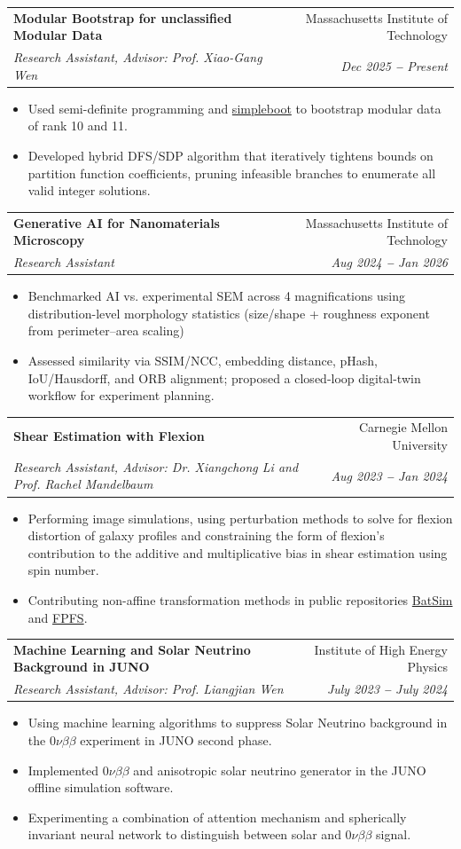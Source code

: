 \documentclass[letterpaper,11pt]{article}
\makeatletter
\newcommand{\resumeItem}[1]{
  \item\small{
    {#1 \vspace{-2pt}}
  }
}
\newcommand{\resumeSubheading}[4]{
  \vspace{-2pt}\item
    \begin{tabular*}{0.97\textwidth}[t]{l@{\extracolsep{\fill}}r}
      \textbf{#1} & #2 \\
      \textit{\small#3} & \textit{\small #4} \\
    \end{tabular*}\vspace{-7pt}
}
\newcommand{\resumeItemListStart}{\begin{itemize}}
\newcommand{\resumeItemListEnd}{\end{itemize}\vspace{-5pt}}
\makeatother
\begin{document}
        \resumeSubheading
      {Modular Bootstrap for unclassified Modular Data}{Massachusetts Institute of Technology}
      {Research Assistant, Advisor: Prof. Xiao-Gang Wen}{Dec 2025 \textbf{--} Present}
        \resumeItemListStart
            \resumeItem{Used semi-definite programming and \href{https://gitlab.com/bootstrapcollaboration/simpleboot}{simpleboot} to bootstrap modular data of rank 10 and 11. }
            \resumeItem{Developed hybrid DFS/SDP algorithm that iteratively tightens bounds on partition function coefficients, pruning infeasible branches to enumerate all valid integer solutions.}
        \resumeItemListEnd
\resumeSubheading
      {Generative AI for Nanomaterials Microscopy}{Massachusetts Institute of Technology}
      {Research Assistant}{Aug 2024 \textbf{--} Jan 2026}
        \resumeItemListStart
            \resumeItem{ Benchmarked AI vs. experimental SEM across 4 magnifications using distribution-level morphology statistics (size/shape + roughness exponent from perimeter–area scaling)}
            \resumeItem{Assessed similarity via SSIM/NCC, embedding distance, pHash, IoU/Hausdorff, and ORB alignment; proposed a closed-loop digital-twin workflow for experiment planning.}
        \resumeItemListEnd
    \resumeSubheading
      {Shear Estimation with Flexion}{Carnegie Mellon University}
      {Research Assistant, Advisor: Dr. Xiangchong Li and Prof. Rachel Mandelbaum}{Aug 2023 \textbf{--} Jan 2024}
        \resumeItemListStart
            \resumeItem{Performing image simulations, using perturbation methods to solve for flexion distortion of galaxy profiles and constraining the form of flexion’s contribution to the additive and multiplicative bias in shear estimation using spin number.}
            \resumeItem{Contributing non-affine transformation methods in public repositories \href{https://github.com/CMacM/BATSim}{BatSim} and \href{https://github.com/mr-superonion/FPFS}{FPFS}.}
        \resumeItemListEnd
    \resumeSubheading
      {Machine Learning and Solar Neutrino Background in JUNO}{Institute of High Energy Physics}
      {Research Assistant, Advisor: Prof. Liangjian Wen}{July 2023 \textbf{--} July 2024}
        \resumeItemListStart
            \resumeItem{Using machine learning algorithms to suppress Solar Neutrino background in the $0\nu \beta\beta$ experiment in JUNO second phase.}
            \resumeItem{Implemented $0\nu \beta\beta$ and anisotropic solar neutrino generator in the JUNO offline simulation software.}
            \resumeItem{Experimenting a combination of attention mechanism and spherically invariant neural network to distinguish between solar and $0\nu \beta\beta$ signal. }
        \resumeItemListEnd
\end{document}
